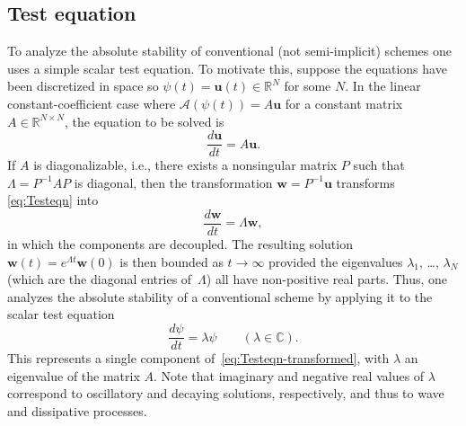 \documentclass[12pt]{article}
\newcommand{\R}{\mathbb{R}}
\newcommand{\C}{\mathbb{C}}
\renewcommand{\u}{\mathbf{u}}
\newcommand{\w}{\mathbf{w}}
\newcommand{\opA}{\mathcal{A}}
\begin{document}
\pagebreak[3]
\subsection{Test equation}

To analyze the absolute stability of conventional (not semi-implicit) schemes
one uses a simple scalar test equation.  To motivate this, suppose
the equations have been discretized in space so $\psi(t)=\u(t)\in\R^N$ for
some $N$.  In the linear constant-coefficient case where $\opA(\psi(t))=A\u$
for a constant matrix $A\in\R^{N\times N}$, the equation to be solved is
\begin{equation}
  \frac{d\u}{dt} =  A\u .
\label{eq:Testeqn}
\end{equation}
If $A$ is diagonalizable, i.e., there exists a nonsingular matrix $P$ such
that $\Lambda = P^{-1}AP$ is diagonal, then the transformation $\w=P^{-1}\u$
transforms \eqref{eq:Testeqn} into
\begin{equation}
  \frac{d\w}{dt} =  \Lambda\w ,
\label{eq:Testeqn-transformed}
\end{equation}
in which the components are decoupled.  The resulting solution 
\begin{math}
  \w(t) = e^{\Lambda t}\w(0)
\end{math}
is then bounded as $t\to\infty$ provided the eigenvalues $\lambda_1$, \dots,
$\lambda_N$ (which are the diagonal entries of~$\Lambda$) all have non-positive 
real parts.  
Thus, one analyzes the absolute stability of a conventional scheme by applying 
it to the scalar test equation
\begin{equation}
  \frac{d\psi}{dt} = \lambda\psi  \qquad (\lambda\in\C).
\label{eq:test1}
\end{equation}
This represents a single component of~\eqref{eq:Testeqn-transformed}, 
with $\lambda$ an eigenvalue of the matrix $A$.  Note that imaginary and
negative real values of $\lambda$ correspond to oscillatory and decaying
solutions, respectively, and thus to wave and dissipative processes.
\end{document}
